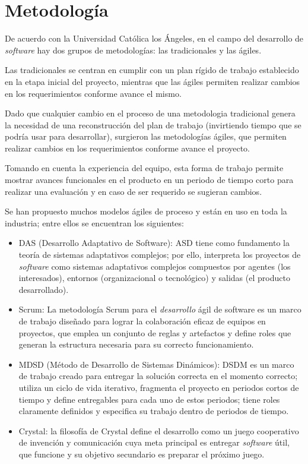 
\section{Metodología}
De acuerdo con la Universidad Católica los Ángeles\cite{universidad_catolica_los_angeles_metodologidesarrollo_2020}, en el campo del desarrollo de \textit{software} hay dos grupos de metodologías: las tradicionales y las ágiles.


Las tradicionales se centran en cumplir con un plan rígido de trabajo establecido en la etapa inicial del proyecto, mientras que las ágiles permiten realizar cambios en los requerimientos conforme avance el mismo.


Dado que cualquier cambio en el proceso de una metodologia tradicional genera la necesidad de una reconstrucción del plan de trabajo (invirtiendo tiempo que se podría usar para desarrollar), surgieron las metodologías ágiles, que permiten realizar cambios en los requerimientos conforme avance el proyecto.


Tomando en cuenta la experiencia del equipo, esta forma de trabajo permite mostrar avances funcionales en el producto en un periodo de tiempo corto para realizar una evaluación y en caso de ser requerido se sugieran cambios.


Se han propuesto muchos modelos ágiles de proceso y están en uso en toda la industria; entre ellos se encuentran los siguientes:


\begin{itemize}
	\item DAS (Desarrollo Adaptativo de Software): ASD tiene como fundamento la teoría de sistemas adaptativos complejos; por ello, interpreta los proyectos de \textit{software} como sistemas adaptativos complejos compuestos
    por agentes (los interesados), entornos (organizacional o tecnológico) y salidas (el producto desarrollado)\cite{cadavid_revision_2013}.
	\item Scrum: La metodología Scrum para el \textit{desarrollo} ágil de software es un marco de trabajo diseñado para lograr la colaboración eficaz de equipos en proyectos, que emplea un conjunto de reglas y artefactos y define roles que generan la estructura necesaria para su correcto funcionamiento\cite{cadavid_revision_2013}.
	\item MDSD (Método de Desarrollo de Sistemas Dinámicos): DSDM es un marco de trabajo creado para entregar la solución correcta en el momento correcto; utiliza un ciclo de vida iterativo, fragmenta el proyecto en periodos cortos de tiempo y define entregables para cada uno de estos periodos; tiene roles claramente definidos y especifica su trabajo dentro de periodos de tiempo\cite{cadavid_revision_2013}.
	\item Crystal: la filosofía de Crystal define el desarrollo como un juego cooperativo de invención y comunicación cuya meta principal es entregar \textit{software} útil, que funcione y su objetivo secundario es preparar el próximo juego\cite{cadavid_revision_2013}.
\end{itemize}

